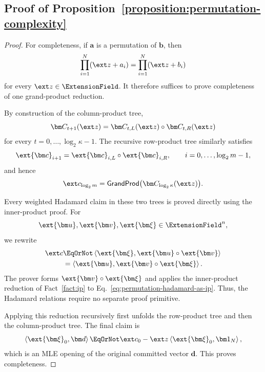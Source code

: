 \subsection{Proof of Proposition~\ref{proposition:permutation-complexity}}
\label{appx:proof-permutation}

\begin{proof}
For completeness, if \(\bm a\) is a permutation of \(\bm b\),
then
\[
    \prod_{i=1}^{N}(\ext z+a_i)
    =
    \prod_{i=1}^{N}(\ext z+b_i)
\]
for every \(\ext z\in\ExtensionField\). It therefore suffices to
prove completeness of one grand-product reduction.

By construction of the column-product tree,
\[
    \bm C_{t+1}(\ext z)
    =
    \bm C_{t,L}(\ext z)
    \circ
    \bm C_{t,R}(\ext z)
\]
for every
\(t=0,\ldots,\log_2\kappa-1\). The recursive row-product tree
similarly satisfies
\[
    \ext{\bm c}_{i+1}
    =
    \ext{\bm c}_{i,L}
    \circ
    \ext{\bm c}_{i,R},
    \qquad
    i=0,\ldots,\log_2m-1,
\]
and hence
\[
    \ext c_{\log_2m}
    =
    \mathsf{GrandProd}
    \bigl(
        \bm C_{\log_2\kappa}(\ext z)
    \bigr).
\]

Every weighted Hadamard claim in these two trees is proved
directly using the inner-product proof. For
\[
    \ext{\bm u},
    \ext{\bm v},
    \ext{\bm\xi}
    \in\ExtensionField^n,
\]
we rewrite
\begin{equation}
\begin{aligned}
    \ext c
    &\EqOrNot
    \left\langle
        \ext{\bm\xi},
        \ext{\bm u}\circ\ext{\bm v}
    \right\rangle\\
    &=
    \left\langle
        \ext{\bm u},
        \ext{\bm v}\circ\ext{\bm\xi}
    \right\rangle.
\end{aligned}
\label{eq:permutation-hadamard-as-ip}
\end{equation}
The prover forms
\(
    \ext{\bm v}\circ\ext{\bm\xi}
\)
and applies the inner-product reduction of
Fact~\ref{fact:ip} to
Eq.~\eqref{eq:permutation-hadamard-as-ip}. Thus, the Hadamard
relations require no separate proof primitive.

Applying this reduction recursively first unfolds the
row-product tree and then the column-product tree. The final
claim is
\[
    \left\langle
        \ext{\bm\xi}_0,\bm d
    \right\rangle
    \EqOrNot
    \ext c_0
    -
    \ext z
    \left\langle
        \ext{\bm\xi}_0,\bm 1_N
    \right\rangle,
\]
which is an MLE opening of the original committed vector
\(\bm d\). This proves completeness.


\end{proof}
